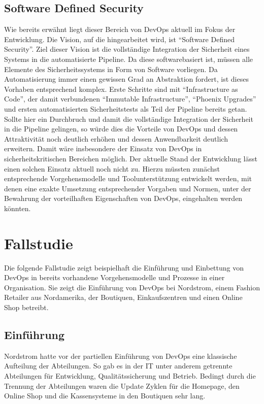 \subsection{Software Defined Security}
Wie bereits erwähnt liegt dieser Bereich von DevOps aktuell im Fokus der Entwicklung. 
Die Vision, auf die hingearbeitet wird, ist \enquote{Software Defined Security}. 
Ziel dieser Vision ist die vollständige Integration der Sicherheit eines Systems in die automatisierte Pipeline. 
Da diese softwarebasiert ist, müssen alle Elemente des Sicherheitssystems in Form von Software vorliegen. 
Da Automatisierung immer einen gewissen Grad an Abstraktion fordert, ist dieses Vorhaben entsprechend komplex. 
Erste Schritte sind mit \enquote{Infrastructure as Code}, der damit verbundenen \enquote{Immutable Infrastructure}, \enquote{Phoenix Upgrades} und ersten automatisierten Sicherheitstests als Teil der Pipeline bereits getan. 
Sollte hier ein Durchbruch und damit die vollständige Integration der Sicherheit in die Pipeline gelingen, so würde dies die Vorteile von DevOps und dessen Attraktivität noch deutlich erhöhen und dessen Anwendbarkeit deutlich erweitern.
Damit wäre insbesondere der Einsatz von DevOps in sicherheitskritischen Bereichen möglich. 
Der aktuelle Stand der Entwicklung lässt einen solchen Einsatz aktuell noch nicht zu. 
Hierzu müssten zunächst entsprechende Vorgehensmodelle und Toolunterstützung entwickelt werden, mit denen eine exakte Umsetzung entsprechender Vorgaben und Normen, unter der Bewahrung der vorteilhaften Eigenschaften von DevOps, eingehalten werden könnten. \parencite[Vgl.][S. 27]{fisher-miranda:2014}

\section{Fallstudie} %
Die folgende Fallstudie zeigt beispielhaft die Einführung und Einbettung von DevOps in bereits vorhandene Vorgehensmodelle und Prozesse in einer Organisation. 
Sie zeigt die Einführung von DevOps bei Nordstrom, einem Fashion Retailer aus Nordamerika, der Boutiquen, Einkaufszentren und einen Online Shop betreibt.

\subsection{Einführung}
Nordstrom hatte vor der partiellen Einführung von DevOps eine klassische Aufteilung der Abteilungen. 
So gab es in der IT unter anderem getrennte Abteilungen für Entwicklung, Qualitätssicherung und Betrieb.
Bedingt durch die Trennung der Abteilungen waren die Update Zyklen für die Homepage, den Online Shop und die Kassensysteme in den Boutiquen sehr lang. 
\parencite[Vgl.][S. 1 - 2]{Reed:2014}


